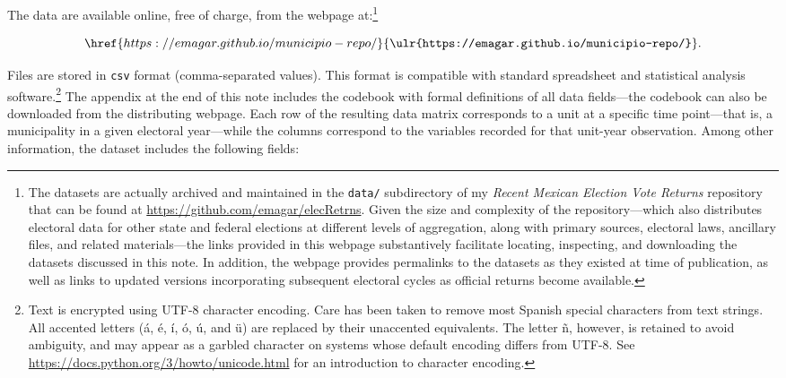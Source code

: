 \documentclass[letter,12pt]{article}
\begin{document}
The data are available online, free of charge, from the webpage at:\footnote{The datasets are actually archived and maintained in the \verb|data/| subdirectory of my \emph{Recent Mexican Election Vote Returns} repository that can be found at \url{https://github.com/emagar/elecRetrns}. Given the size and complexity of the repository---which also distributes electoral data for other state and federal elections at different levels of aggregation, along with primary sources, electoral laws, ancillary files, and related materials---the links provided in this webpage substantively facilitate locating, inspecting, and downloading the datasets discussed in this note. In addition, the webpage provides permalinks to the datasets as they existed at time of publication, as well as links to updated versions incorporating subsequent electoral cycles as official returns become available.}

\begin{equation*}
\href{https://emagar.github.io/municipio-repo/}{\texttt{\ulr{https://emagar.github.io/municipio-repo/}}}.
\end{equation*}

\noindent Files are stored in \verb|csv| format (comma-separated values). This format is compatible with standard spreadsheet and statistical analysis software.\footnote{Text is encrypted using UTF-8 character encoding. Care has been taken to remove most Spanish special characters from text strings. All accented letters (\'a, \'e, \'i, \'o, \'u, and \"u) are replaced by their unaccented equivalents. The letter \~n, however, is retained to avoid ambiguity, and may appear as a garbled character on systems whose default encoding differs from UTF-8. See \url{https://docs.python.org/3/howto/unicode.html} for an introduction to character encoding.} The appendix at the end of this note includes the codebook with formal definitions of all data fields---the codebook can also be downloaded from the distributing webpage. Each row of the resulting data matrix corresponds to a unit at a specific time point---that is, a municipality in a given electoral year---while the columns correspond to the variables recorded for that unit-year observation. Among other information, the dataset includes the following fields:
\end{document}
